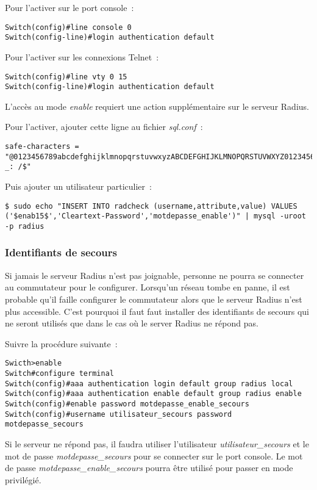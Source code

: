 Pour l'activer sur le port console~:

\begin{lstlisting}
Switch(config)#line console 0
Switch(config-line)#login authentication default
\end{lstlisting}

Pour l'activer sur les connexions Telnet~:

\begin{lstlisting}
Switch(config)#line vty 0 15
Switch(config-line)#login authentication default
\end{lstlisting}

L'accès au mode \textit{enable} requiert une action supplémentaire sur le serveur Radius.

Pour l'activer, ajouter cette ligne au fichier \textit{sql.conf}~:

\begin{lstlisting}
safe-characters = "@0123456789abcdefghijklmnopqrstuvwxyzABCDEFGHIJKLMNOPQRSTUVWXYZ0123456789.-_: /$"
\end{lstlisting}

Puis ajouter un utilisateur particulier~:

\begin{lstlisting}
$ sudo echo "INSERT INTO radcheck (username,attribute,value) VALUES ('$enab15$','Cleartext-Password','motdepasse_enable')" | mysql -uroot -p radius
\end{lstlisting}

\subsubsection{Identifiants de secours}

Si jamais le serveur Radius n'est pas joignable, personne ne pourra se connecter au commutateur pour le configurer. Lorsqu'un réseau tombe en panne, il est probable qu'il faille configurer le commutateur alors que le serveur Radius n'est plus accessible. C'est pourquoi il faut faut installer des identifiants de secours qui ne seront utilisés que dans le cas où le server Radius ne répond pas.

Suivre la procédure suivante~:

\begin{lstlisting}
Swicth>enable
Switch#configure terminal
Switch(config)#aaa authentication login default group radius local
Switch(config)#aaa authentication enable default group radius enable
Switch(config)#enable password motdepasse_enable_secours
Switch(config)#username utilisateur_secours password motdepasse_secours
\end{lstlisting}

Si le serveur ne répond pas, il faudra utiliser l'utilisateur \emph{utilisateur\_secours} et le mot de passe \emph{motdepasse\_secours} pour se connecter sur le port console. Le mot de passe \emph{motdepasse\_enable\_secours} pourra être utilisé pour passer en mode privilégié.
